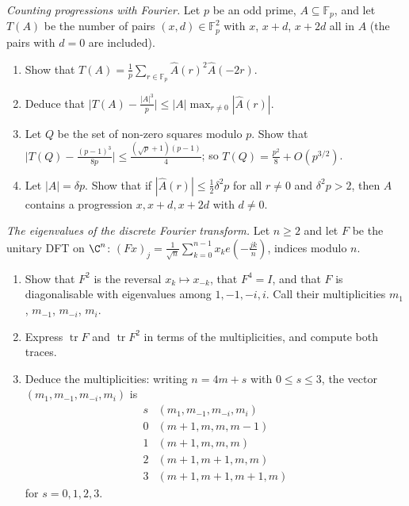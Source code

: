 \begin{exercise}[$\star\star$]\label{pb:apcount}
\emph{Counting progressions with Fourier.} Let $p$ be an odd prime, $A\subseteq\mathbb F_p$, and let $T(A)$ be the number of pairs
$(x,d)\in\mathbb F_p^2$ with $x$, $x+d$, $x+2d$ all in $A$ (the pairs with $d=0$ are included).
\begin{enumerate}[label=(\alph*)]
\item Show that $T(A)=\frac1p\sum_{r\in\mathbb F_p}\hat A(r)^2\hat A(-2r)$.
\item Deduce that $\bigl|T(A)-\frac{|A|^3}p\bigr|\le|A|\max_{r\ne0}|\hat A(r)|$.
\item Let $Q$ be the set of non-zero squares modulo $p$. Show that $\bigl|T(Q)-\frac{(p-1)^3}{8p}\bigr|\le\frac{(\sqrt p+1)(p-1)}4$; so $T(Q)=\frac{p^2}8+O(p^{3/2})$.
\item Let $|A|=\delta p$. Show that if $|\hat A(r)|\le\frac12\delta^2p$ for all $r\ne0$ and $\delta^2p>2$, then $A$ contains a
progression $x,x+d,x+2d$ with $d\ne0$.
\end{enumerate}
\end{exercise}

\begin{exercise}[$\star\star\star$]\label{pb:dftspectrum}
\emph{The eigenvalues of the discrete Fourier transform.} Let $n\ge2$ and let $F$ be the unitary DFT on $\C^n$:
$(Fx)_j=\frac1{\sqrt n}\sum_{k=0}^{n-1}x_ke(-\frac{jk}n)$, indices modulo $n$.
\begin{enumerate}[label=(\alph*)]
\item Show that $F^2$ is the reversal $x_k\mapsto x_{-k}$, that $F^4=I$, and that $F$ is diagonalisable with eigenvalues among
$1,-1,-i,i$. Call their multiplicities $m_1$, $m_{-1}$, $m_{-i}$, $m_i$.
\item Express $\operatorname{tr}F$ and $\operatorname{tr}F^2$ in terms of the multiplicities, and compute both traces.
\item Deduce the multiplicities: writing $n=4m+s$ with $0\le s\le3$, the vector $(m_1,m_{-1},m_{-i},m_i)$ is
\[
\begin{array}{c|c}
s&(m_1,m_{-1},m_{-i},m_i)\\\hline
0&(m+1,m,m,m-1)\\
1&(m+1,m,m,m)\\
2&(m+1,m+1,m,m)\\
3&(m+1,m+1,m+1,m)
\end{array}
\]
for $s=0,1,2,3$.
\end{enumerate}
\end{exercise}

